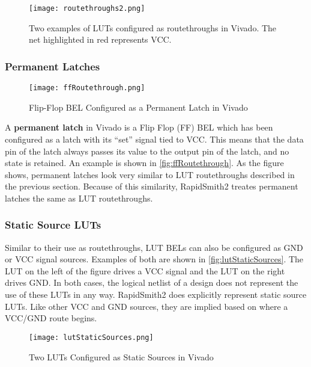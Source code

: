 \begin{figure}[h]
  \centering
  \texttt{[image: routethroughs2.png]}
  \caption{Two examples of LUTs configured as routethroughs in Vivado. The net
  highlighted in red represents VCC.}
  \label{fig:routethroughs}
\end{figure}

\subsubsection {Permanent Latches}

\begin{figure}[b!]
  \centering
  \texttt{[image: ffRoutethrough.png]}
  \caption{Flip-Flop BEL Configured as a Permanent Latch in Vivado}
  \label{fig:ffRoutethrough}
\end{figure}

A \textbf{permanent latch} in Vivado is a Flip Flop (FF) BEL which has been
configured as a latch with its ``set'' signal tied to VCC. This means that the
data pin of the latch always passes its value to the output pin of the latch,
and no state is retained. An example is shown in \autoref{fig:ffRoutethrough}.
As the figure shows, permanent latches look very similar to LUT routethroughs
described in the previous section. Because of this similarity, RapidSmith2
treates permanent latches the same as LUT routethroughs.

\subsubsection{Static Source LUTs}
Similar to their use as routethroughs, LUT BELs can also be configured as GND or
VCC signal sources. Examples of both are shown in
\autoref{fig:lutStaticSources}. The LUT on the left of the figure drives a VCC
signal and the LUT on the right drives GND. In both cases, the logical
netlist of a design does not represent the use of these LUTs in any way.
RapidSmith2 does explicitly represent static source LUTs. Like other VCC and GND
sources, they are implied based on where a VCC/GND route begins.

\begin{figure}[h]
  \centering
  \texttt{[image: lutStaticSources.png]}
  \caption{Two LUTs Configured as Static Sources in Vivado}
  \label{fig:lutStaticSources}
\end{figure}

\vspace{-.2in}

